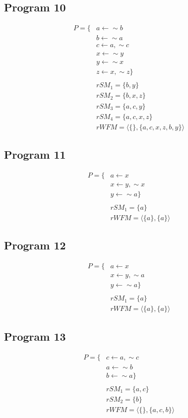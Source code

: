 \subsection{Program 10}
\begin{align*}
P=\{
& a\leftarrow \sim b\\
& b\leftarrow \sim a\\
& c\leftarrow a,\sim c\\
& x\leftarrow \sim y\\
& y\leftarrow \sim x\\
& z\leftarrow x,\sim z
\}\\
\\
& rSM_{1}=\{b,y\}\\
& rSM_{2}=\{b,x,z\}\\
& rSM_{3}=\{a,c,y\}\\
& rSM_{4}=\{a,c,x,z\}\\
& rWFM=\langle\{\},\{a,c,x,z,b,y\}\rangle\end{align*}

\subsection{Program 11}
\begin{align*}
P=\{
& a\leftarrow x\\
& x\leftarrow y, \sim x\\
& y\leftarrow \sim a
\}\\
\\
& rSM_{1}=\{a\}\\
& rWFM=\langle\{a\},\{a\}\rangle\end{align*}

\subsection{Program 12}
\begin{align*}
P=\{
& a\leftarrow x\\
& x\leftarrow y, \sim a\\
& y\leftarrow \sim a
\}\\
\\
& rSM_{1}=\{a\}\\
& rWFM=\langle\{a\},\{a\}\rangle\end{align*}

\subsection{Program 13}
\begin{align*}
P=\{
& c\leftarrow a,\sim c\\
& a\leftarrow \sim b\\
& b\leftarrow \sim a
\}\\
\\
& rSM_{1}=\{a,c\}\\
& rSM_{2}=\{b\}\\
& rWFM=\langle\{\},\{a,c,b\}\rangle\end{align*}


